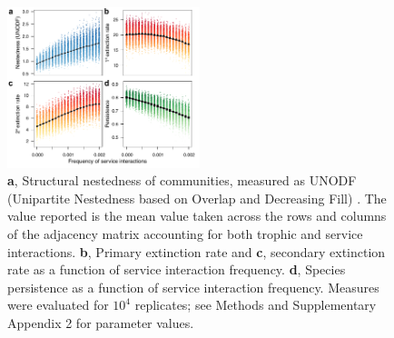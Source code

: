 \documentclass[twocolumn,preprintnumbers,amsmath,amssymb,superscriptaddress,linenumbers]{revtex4-1}
\begin{document}


\begin{figure}[h!]
\centering
\includegraphics[width=0.5\textwidth]{fig_nested4.pdf}
\vspace{-6mm}
\caption{
\textbf{a}, Structural nestedness of communities, measured as UNODF (Unipartite Nestedness based on Overlap and Decreasing Fill) \cite{Cantor2017}.
The value reported is the mean value taken across the rows and columns of the adjacency matrix accounting for both trophic and service interactions.
\textbf{b}, Primary extinction rate and \textbf{c}, secondary extinction rate as a function of service interaction frequency.
\textbf{d}, Species persistence as a function of service interaction frequency.
Measures were evaluated for $10^4$ replicates; see Methods and Supplementary Appendix 2 for parameter values.
\vspace{-6mm}
}
\label{fig:nest}
\end{figure}
\end{document}
